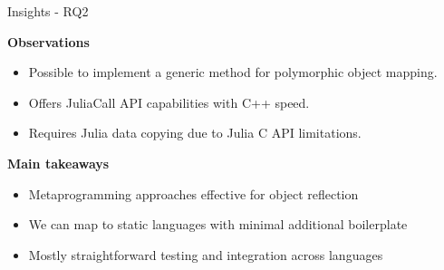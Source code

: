 \begin{frame}{Insights - RQ2}
    
    \textbf{Observations}
    \begin{itemize}
      \item Possible to implement a generic method for polymorphic object mapping.
      \item Offers JuliaCall API capabilities with C++ speed.
      \item Requires Julia data copying due to Julia C API limitations.
    \end{itemize}
    \pause
    \textbf{Main takeaways}
    \begin{itemize}
      \item Metaprogramming approaches effective for object reflection
      \item We can map to static languages with minimal additional boilerplate
      \item Mostly straightforward testing and integration across languages
    \end{itemize}
    \end{frame}
    